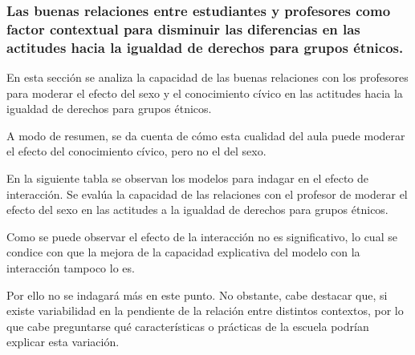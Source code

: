 \documentclass[12pt,twoside]{templates/facsothesis}
\begin{document}
\hypertarget{las-buenas-relaciones-entre-estudiantes-y-profesores-como-factor-contextual-para-disminuir-las-diferencias-en-las-actitudes-hacia-la-igualdad-de-derechos-para-grupos-uxe9tnicos.}{%
\subsubsection{Las buenas relaciones entre estudiantes y profesores como factor contextual para disminuir las diferencias en las actitudes hacia la igualdad de derechos para grupos étnicos.}\label{las-buenas-relaciones-entre-estudiantes-y-profesores-como-factor-contextual-para-disminuir-las-diferencias-en-las-actitudes-hacia-la-igualdad-de-derechos-para-grupos-uxe9tnicos.}}

En esta sección se analiza la capacidad de las buenas relaciones con los profesores para moderar el efecto del sexo y el conocimiento cívico en las actitudes hacia la igualdad de derechos para grupos étnicos.

A modo de resumen, se da cuenta de cómo esta cualidad del aula puede moderar el efecto del conocimiento cívico, pero no el del sexo.

En la siguiente tabla se observan los modelos para indagar en el efecto de interacción. Se evalúa la capacidad de las relaciones con el profesor de moderar el efecto del sexo en las actitudes a la igualdad de derechos para grupos étnicos.

Como se puede observar el efecto de la interacción no es significativo, lo cual se condice con que la mejora de la capacidad explicativa del modelo con la interacción tampoco lo es.

Por ello no se indagará más en este punto. No obstante, cabe destacar que, si existe variabilidad en la pendiente de la relación entre distintos contextos, por lo que cabe preguntarse qué características o prácticas de la escuela podrían explicar esta variación.
\end{document}

